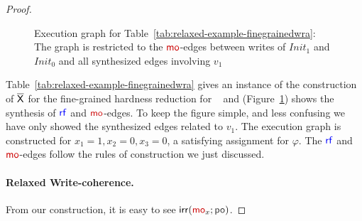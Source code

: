 \begin{proof}
\begin{figure}
\begin{center}
%
\end{center}
\caption{Execution graph for Table~\ref{tab:relaxed-example-finegrainedwra}: The graph is restricted to the $\mo$-edges between writes of $Init_1$ and $Init_0$ and all synthesized  edges involving $v_1$}
\label{example-Execution-relaxed}
\end{figure}%

    
    Table~\ref{tab:relaxed-example-finegrainedwra} gives an instance of the construction of $\overline{\mathsf{\color{black}X}}$ for the fine-grained hardness reduction for \threewriter~ and (Figure~\ref{example-Execution-relaxed}) shows the synthesis of $\rf$ and $\mo$-edges. To keep the figure simple, and less confusing we have only showed the synthesized edges related to $v_1$. The execution graph is constructed for $x_1=1, x_2=0, x_3=0$, a satisfying assignment for $\varphi$. The $\rf$ and $\mo$-edges follow the rules of construction we just discussed. 
    
    

    \paragraph*{Relaxed Write-coherence.} From our construction, it is easy to see $\irr(\mo_x; \po)$.


\end{proof}
